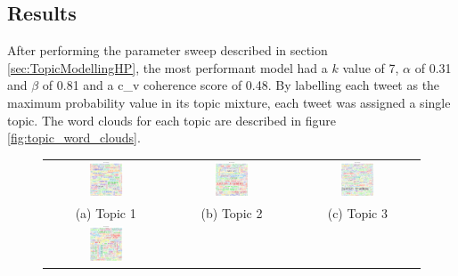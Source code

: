 \subsection{Results}\label{sec:TopicModellingRes}

After performing the parameter sweep described in section
\ref{sec:TopicModellingHP}, the most performant model had a $k$ value of 7,
$\alpha$ of 0.31 and $\beta$ of 0.81 and a c\_v coherence score of 0.48. By
labelling each tweet as the maximum probability value in its topic mixture, each
tweet was assigned a single topic. The word clouds for each topic are described
in figure \ref{fig:topic_word_clouds}. 

\begin{singlespacing}
    \begin{figure}
        \centering
        \begin{tabular}{ccc}
        \includegraphics[width=0.30\textwidth]{Figures/topic_1_wordcloud} &
        \includegraphics[width=0.30\textwidth]{Figures/topic_2_wordcloud} &
        \includegraphics[width=0.30\textwidth]{Figures/topic_3_wordcloud} \\
        (a) Topic 1 & (b) Topic 2 & (c) Topic 3  \\[6pt]
        \includegraphics[width=0.30\textwidth]{Figures/topic_4_wordcloud} &

\end{tabular}
\end{figure}
\end{singlespacing}

